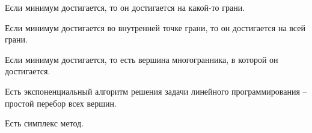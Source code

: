 \documentclass[document.tex]{subfiles}
\begin{document}
\begin{statement}
Если минимум достигается, то он достигается на какой-то грани.
\end{statement}

\begin{statement}
Если минимум достигается во внутренней точке грани, то он достигается на всей грани.
\end{statement}

\begin{corollary}
Если минимум достигается, то есть вершина многогранника, в которой он достигается.
\end{corollary}

\begin{corollary}
Есть экспоненциальный алгоритм решения задачи линейного программирования -- простой перебор всех вершин.
\end{corollary}

\begin{remark}
Есть симплекс метод.
\end{remark}
\end{document}
